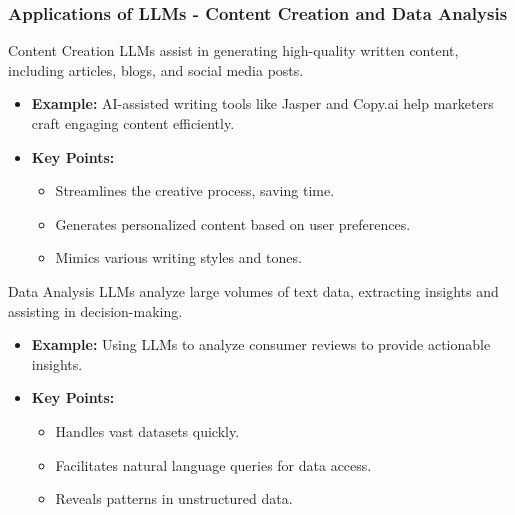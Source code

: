 \documentclass[aspectratio=169]{beamer}
\begin{document}
\begin{frame}[fragile]
    \frametitle{Applications of LLMs - Content Creation and Data Analysis}
    \begin{block}{Content Creation}
        LLMs assist in generating high-quality written content, including articles, blogs, and social media posts.
    \end{block}
    \begin{itemize}
        \item \textbf{Example:} AI-assisted writing tools like Jasper and Copy.ai help marketers craft engaging content efficiently.
        \item \textbf{Key Points:}
        \begin{itemize}
            \item Streamlines the creative process, saving time.
            \item Generates personalized content based on user preferences.
            \item Mimics various writing styles and tones.
        \end{itemize}
    \end{itemize}
    
    \vspace{1em}
    
    \begin{block}{Data Analysis}
        LLMs analyze large volumes of text data, extracting insights and assisting in decision-making.
    \end{block}
    \begin{itemize}
        \item \textbf{Example:} Using LLMs to analyze consumer reviews to provide actionable insights.
        \item \textbf{Key Points:}
        \begin{itemize}
            \item Handles vast datasets quickly.
            \item Facilitates natural language queries for data access.
            \item Reveals patterns in unstructured data.
        \end{itemize}
    \end{itemize}
\end{frame}
\end{document}
